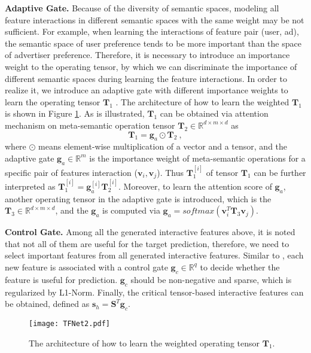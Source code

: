 \documentclass[sigconf]{acmart}
\begin{document}
\textbf{Adaptive Gate.} Because of the diversity of semantic spaces, modeling all feature interactions in different semantic spaces with the same weight  may be not sufficient. For example, when learning the interactions of feature pair (user, ad), the semantic space of user preference tends to be more important than the space of advertiser preference. Therefore, it is necessary to introduce an importance weight to the operating tensor, by which we can discriminate the importance of different semantic spaces during learning the feature interactions. In order to realize it, we introduce an adaptive gate with different importance weights to learn the operating tensor $\mathbf{T}_1$ . The architecture of how to learn the weighted $\mathbf{T}_1$ is shown in Figure \ref{TFNet2}. As is illustrated, $\mathbf{T}_1$ can be obtained via attention mechanism on meta-semantic operation tensor $\mathbf{T}_2\in \mathbb{R} ^{d\times m\times d}$ as 
\begin{equation}
\mathbf{T}_1=\mathbf{g}_a\odot \mathbf{T}_2~, 
\end{equation}
where $\odot$ means element-wise multiplication of a vector and a tensor, and the adaptive gate $\mathbf{g}_a\in \mathbb{R} ^{m}$ is the importance weight of meta-semantic operations for a specific pair of features interaction ($\mathbf{v}_i, \mathbf{v}_j$). Thus $\mathbf{T}_1^{[i]}$ of tensor $\mathbf{T}_1$ can be further interpreted as $\mathbf{T}_1^{[i]} = \mathbf{g}_a^{[i]}\mathbf{T}_2^{[i]}$. Moreover, to learn the attention score of $\mathbf{g}_a$, another operating tensor in the adaptive gate is introduced, which is the $\mathbf{T}_3\in \mathbb{R} ^{d\times m\times d}$, and the $\mathbf{g}_a$ is computed via $\mathbf{g}_a=softmax(\mathbf{v}_i^T{\mathbf{T}_3}\mathbf{v}_j)$. 

\textbf{Control Gate.}  Among all the generated interactive features above, it is noted that not all of them are useful for the target prediction, therefore, we need to select important features from all generated interactive features. Similar to \cite{wang2018interpret}, each new feature is associated with a control gate $\mathbf{g}_c\in \mathbb{R} ^{q}$ to decide whether the feature is useful for prediction. $\mathbf{g}_c$ should be non-negative and sparse, which is regularized by L1-Norm. Finally, the critical tensor-based interactive features can be obtained, defined as $\mathbf{s}_h = \mathbf{S}^T \mathbf{g}_c$.  

\begin{figure}
\setlength{\abovecaptionskip}{0pt}  \setlength{\belowcaptionskip}{0pt}  \centering
\texttt{[image: TFNet2.pdf]}
\caption{The architecture of how to learn the weighted operating tensor $\mathbf{T}_1$.}
\label{TFNet2}
\end{figure}
\end{document}

